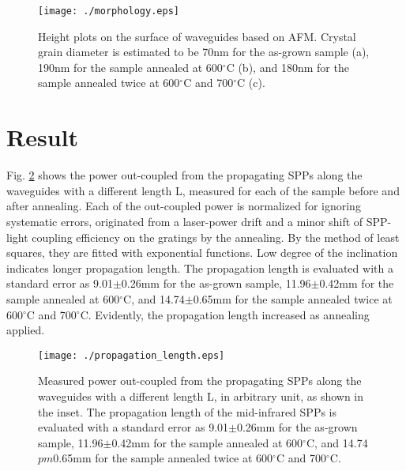 \documentclass[twocolumn,11pt,a4]{article}
\begin{document}
 \begin{figure}[!htbp]
   \begin{center}
    \texttt{[image: ./morphology.eps]}
    \caption{Height plots on the surface of waveguides based on AFM. Crystal grain diameter is estimated to be 70nm for the as-grown sample (a), 190nm for the sample annealed at 600$^\circ\mathrm{C}$ (b), and 180nm for the sample annealed twice at 600$^\circ\mathrm{C}$ and 700$^\circ\mathrm{C}$ (c).}
    \label{fig:morphology}
   \end{center}
\end{figure}

\section{Result}
\label{sec:result}
Fig. \ref{fig:propagation_length} shows the power out-coupled from the propagating SPPs along the waveguides with a different length L, measured for each of the sample before and after annealing.
Each of the out-coupled power is normalized for ignoring systematic errors, originated from a laser-power drift and a minor shift of SPP-light coupling efficiency on the gratings by the annealing.
By the method of least squares, they are fitted with exponential functions. Low degree of the inclination indicates longer propagation length. The propagation length is evaluated with a standard error as 9.01$\pm$0.26mm for the as-grown sample, 11.96$\pm$0.42mm for the sample annealed at 600$^\circ\mathrm{C}$, and 14.74$\pm$0.65mm for the sample annealed twice at 600$^\circ\mathrm{C}$ and 700$^\circ\mathrm{C}$.
Evidently, the propagation length increased as annealing applied.

 \begin{figure}[!htbp]
   \begin{center}
    \texttt{[image: ./propagation\_length.eps]}
    \caption{Measured power out-coupled from the propagating SPPs along the waveguides with a different length L, in arbitrary unit, as shown in the inset. The propagation length of the mid-infrared SPPs is evaluated with a standard error as 9.01$\pm$0.26mm for the as-grown sample, 11.96$\pm$0.42mm for the sample annealed at 600$^\circ\mathrm{C}$, and 14.74$pm$0.65mm for the sample annealed twice at 600$^\circ\mathrm{C}$ and 700$^\circ\mathrm{C}$.}
       \label{fig:propagation_length}
   \end{center}
\end{figure}
\end{document}
